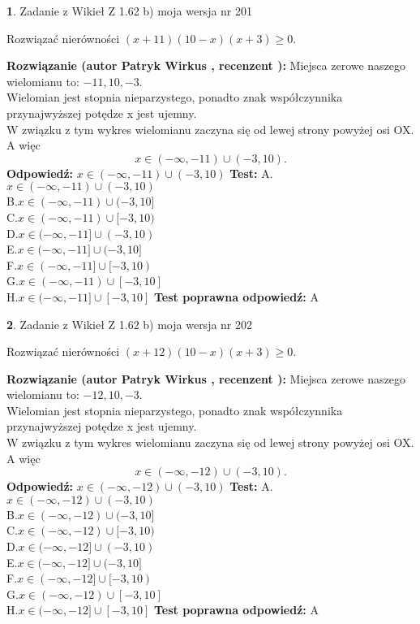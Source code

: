 \documentclass[12pt, a4paper]{article}
\theoremstyle{definition} %
\newtheorem{zad}{}
\newcommand{\zadStart}[1]{\begin{zad}#1\newline}
\newcommand{\zadStop}{\end{zad}}
\newcommand{\rozwStart}[2]{\noindent \textbf{Rozwiązanie (autor #1 , recenzent #2): }\newline}
\newcommand{\rozwStop}{\newline}
\newcommand{\odpStart}{\noindent \textbf{Odpowiedź:}\newline}
\newcommand{\odpStop}{\newline}
\newcommand{\testStart}{\noindent \textbf{Test:}\newline}
\newcommand{\testStop}{\newline}
\newcommand{\kluczStart}{\noindent \textbf{Test poprawna odpowiedź:}\newline}
\newcommand{\kluczStop}{\newline}
\begin{document}
\zadStart{Zadanie z Wikieł Z 1.62 b) moja wersja nr 201}

Rozwiązać nierówności $(x+11)(10-x)(x+3)\ge0$.
\zadStop
\rozwStart{Patryk Wirkus}{}
Miejsca zerowe naszego wielomianu to: $-11, 10, -3$.\\
Wielomian jest stopnia nieparzystego, ponadto znak współczynnika przy\linebreak najwyższej potędze x jest ujemny.\\ W związku z tym wykres wielomianu zaczyna się od lewej strony powyżej osi OX. A więc $$x \in (-\infty,-11) \cup (-3,10).$$
\rozwStop
\odpStart
$x \in (-\infty,-11) \cup (-3,10)$
\odpStop
\testStart
A.$x \in (-\infty,-11) \cup (-3,10)$\\
B.$x \in (-\infty,-11) \cup (-3,10]$\\
C.$x \in (-\infty,-11) \cup [-3,10)$\\
D.$x \in (-\infty,-11] \cup (-3,10)$\\
E.$x \in (-\infty,-11] \cup (-3,10]$\\
F.$x \in (-\infty,-11] \cup [-3,10)$\\
G.$x \in (-\infty,-11) \cup [-3,10]$\\
H.$x \in (-\infty,-11] \cup [-3,10]$
\testStop
\kluczStart
A
\kluczStop



\zadStart{Zadanie z Wikieł Z 1.62 b) moja wersja nr 202}

Rozwiązać nierówności $(x+12)(10-x)(x+3)\ge0$.
\zadStop
\rozwStart{Patryk Wirkus}{}
Miejsca zerowe naszego wielomianu to: $-12, 10, -3$.\\
Wielomian jest stopnia nieparzystego, ponadto znak współczynnika przy\linebreak najwyższej potędze x jest ujemny.\\ W związku z tym wykres wielomianu zaczyna się od lewej strony powyżej osi OX. A więc $$x \in (-\infty,-12) \cup (-3,10).$$
\rozwStop
\odpStart
$x \in (-\infty,-12) \cup (-3,10)$
\odpStop
\testStart
A.$x \in (-\infty,-12) \cup (-3,10)$\\
B.$x \in (-\infty,-12) \cup (-3,10]$\\
C.$x \in (-\infty,-12) \cup [-3,10)$\\
D.$x \in (-\infty,-12] \cup (-3,10)$\\
E.$x \in (-\infty,-12] \cup (-3,10]$\\
F.$x \in (-\infty,-12] \cup [-3,10)$\\
G.$x \in (-\infty,-12) \cup [-3,10]$\\
H.$x \in (-\infty,-12] \cup [-3,10]$
\testStop
\kluczStart
A
\kluczStop
\end{document}
